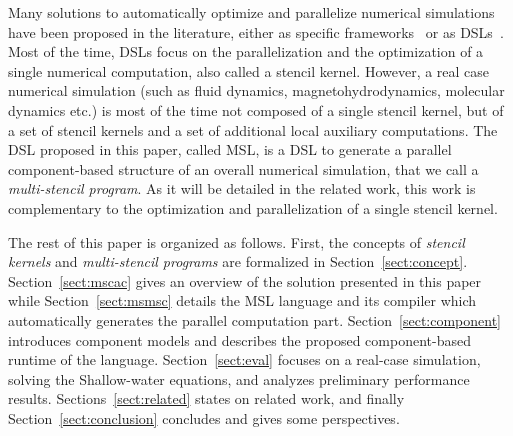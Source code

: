 Many solutions to automatically optimize and parallelize numerical simulations have been proposed in the literature, either as specific frameworks~\cite{CPE:CPE3494,Trilinos-Overview,petsc-efficient} or as DSLs~\cite{spaaTangCKLL11,citeulike12258902,Giles2011,DeVito2011LDS}. Most of the time, DSLs focus on the parallelization and the optimization of a single numerical computation, also called a stencil kernel.
However, a real case numerical simulation (such as fluid dynamics, magnetohydrodynamics, molecular dynamics etc.) is most of the time not composed of a single stencil kernel, but of a set of stencil kernels and a set of additional local auxiliary computations. The DSL proposed in this paper, called MSL, is a DSL to generate a parallel component-based structure of an overall numerical simulation, that we call a \emph{multi-stencil program}. As it will be detailed in the related work, this work is complementary to the optimization and parallelization of a single stencil kernel.

The rest of this paper is organized as follows. First, the concepts of \emph{stencil kernels} and \emph{multi-stencil programs} are formalized in Section~\ref{sect:concept}. Section~\ref{sect:mscac} gives an overview of the solution presented in this paper while Section~\ref{sect:msmsc} details the MSL language and its compiler which automatically generates the parallel computation part. Section~\ref{sect:component} introduces component models and describes the proposed component-based runtime of the language.
Section~\ref{sect:eval} focuses on a real-case simulation, solving the Shallow-water equations, and analyzes preliminary performance results. Sections~\ref{sect:related} states on related work, and finally Section~\ref{sect:conclusion} concludes and gives some perspectives.
